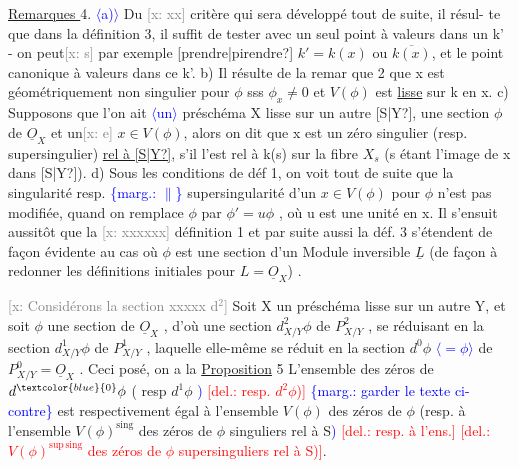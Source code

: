 \documentclass[11pt]{article}
\newcommand{\scanpage}[1]{\par\bigskip\noindent{\small\sffamily[scan #1]}\par}
\newcommand{\mspage}[1]{{\small\sffamily[p.\,#1]}}
\newcommand{\hand}[1]{\textcolor{blue}{#1}}
\newcommand{\inserted}[2][]{\textcolor{blue}{$\langle$#2$\rangle$}}
\newcommand{\margin}[1]{\textcolor{blue}{\{\textsf{marg.:} #1\}}}
\newcommand{\deleted}[1]{\textcolor{red}{[\textsf{del.:} #1]}}
\newcommand{\xout}[1]{\textcolor{gray}{[\textsf{x:} #1]}}
\newcommand{\uline}[1]{\underline{#1}}
\newcommand{\unsure}[1]{[#1?]}
\begin{document}
\mspage{140}

\clearpage
\scanpage{25/141}
\mspage{\hand{2}}

\uline{Remarques }4. \inserted[typed]{a)} Du \xout{xx} critère qui sera développé tout de suite, il résul-%
te que dans la définition 3, il suffit de tester avec un seul point
à valeurs dans un k' - on peut\xout{s} par exemple \unsure{prendre|pirendre} $k'=k(x)$ ou $\overline{k(x)}$, et
le point canonique à valeurs dans ce k'. b) Il résulte de la remar
que 2 que x est géométriquement non singulier pour $\phi$ sss $\phi_x \neq 0$ et
$V(\phi)$ est \uline{lisse} sur k en x. c) Supposons que l'on ait \inserted[typed]{un} préschéma X lisse
sur un autre \unsure{S|Y}, une section $\phi$ de $\underline{O}_X$ et un\xout{e} $x \in V(\phi)$, alors on dit que x
est un zéro singulier (resp. supersingulier) \uline{rel à \unsure{S|Y}}, s'il l'est
rel à k(s) sur la fibre $X_s$ (s étant l'image de x dans \unsure{S|Y}). d) Sous
les conditions de déf 1, on voit tout de suite que la singularité resp.
\margin{$\|$} supersingularité d'un $x \in V(\phi)$ pour $\phi$ n'est pas modifiée, quand on
remplace $\phi$ par $\phi'=u\phi$ , où u est une unité en x. Il s'ensuit aussitôt que
la \xout{xxxxxx} définition 1 et par suite aussi la déf. 3 s'étendent de façon
évidente au cas où $\phi$ est une section d'un Module inversible $\underline{L}$ (de façon
à redonner les définitions initiales pour $L = \underline{O}_X$) .

\xout{Considérons la section xxxxx d$^2$} Soit X un préschéma lisse sur un
autre Y, et soit $\phi$ une section de $\underline{O}_X$ , d'où une section $d^2_{X/Y}\phi$ de
$P^2_{X/Y}$ , se réduisant en la section $d^1_{X/Y}\phi$ de $P^1_{X/Y}$ , laquelle elle-même
se réduit en la section $d^0\phi$ \inserted[typed]{$=\phi$} de $P^0_{X/Y} = \underline{O}_X$ . Ceci posé, on a la
\uline{Proposition} 5 L'ensemble des zéros de $d^{\hand{0}}\phi$ ( resp $d^1\phi$ \hand{)} \deleted{resp. $d^2\phi$)}
\margin{garder le texte ci-contre} est respectivement égal à l'ensemble $V(\phi)$ des zéros de $\phi$ (resp. à
l'ensemble $V(\phi)^{\mathrm{sing}}$ des zéros de $\phi$ singuliers rel à S\hand{)} \deleted{resp. à l'ens.}
\deleted{$V(\phi)^{\mathrm{sup\,sing}}$ des zéros de $\phi$ supersinguliers rel à S)}.
\end{document}
